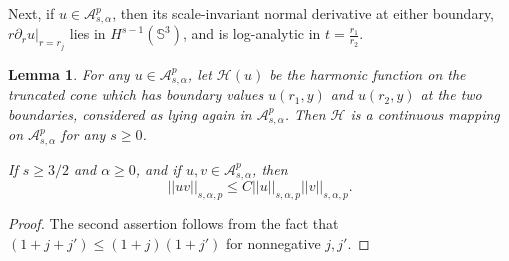 \documentclass[12pt]{article}
\newtheorem{lem}[thm]{Lemma}
\newtheorem{rem}[thm]{Remark}
\newcommand{\del}{\partial}
\newcommand{\calA}{{\mathcal A}}
\newcommand{\calH}{\mathcal H}
\begin{document}
Next, if $u \in \calA^p_{s,\alpha}$, then its scale-invariant normal derivative at either boundary, $r\del_r u|_{r = r_j}$ lies in 
$H^{s-1}(\mathbb{S}^3)$, and is log-analytic in $t = \frac{r_1}{r_2}$.

\begin{lem}
For any $u \in \calA^p_{s,\alpha}$, let $\calH(u)$ be the harmonic function on the truncated cone which has
boundary values $u(r_1,y)$ and $u(r_2, y)$ at the two boundaries, considered as lying again in $\calA^p_{s,\alpha}$.
Then $\calH$ is a continuous mapping on $\calA^p_{s,\alpha}$ for any $s \geq 0$.

If $s \geq 3/2$ and $\alpha \geq 0$, and if $u, v \in \calA^p_{s,\alpha}$, then
\[
||uv||_{s,\alpha,p} \leq C ||u||_{s,\alpha,p} ||v||_{s,\alpha,p}.
\]
\end{lem}
\begin{proof}
The second assertion follows from the fact that $(1+j +j')\leqslant(1+j)(1+j')$ for nonnegative $j,j'$.
\end{proof}



\end{document}
